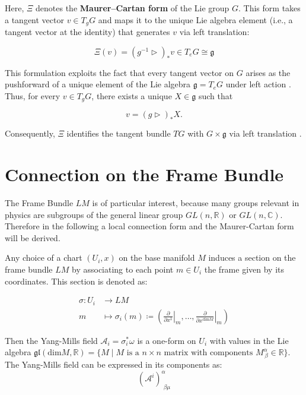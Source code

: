 Here, \( \Xi \) denotes the \textbf{Maurer–Cartan form} of the Lie group \( G \). This form takes a tangent vector \( v \in T_gG \) and maps it to the unique Lie algebra element (i.e., a tangent vector at the identity) that generates \( v \) via left translation:

\[
\Xi(v) = (g^{-1} \triangleright)_* v \in T_eG \cong \mathfrak{g}
\]

This formulation exploits the fact that every tangent vector on \( G \) arises as the pushforward of a unique element of the Lie algebra \( \mathfrak{g} = T_eG \) under left action \cite{RaghunathanLieGroupsLieAlgebras2025}. Thus, for every \( v \in T_gG \), there exists a unique \( X \in \mathfrak{g} \) such that

\[
v = (g \triangleright)_* X.
\]

Consequently, \( \Xi \) identifies the tangent bundle \( TG \) with \( G \times \mathfrak{g} \) via left translation \cite{MaurerCartanform2025}.

\section{Connection on the Frame Bundle}

The Frame Bundle $LM$ is of particular interest, because many groups relevant in physics are subgroups of the general linear group \( GL(n, \mathbb{R}) \) or \( GL(n, \mathbb{C}) \). Therefore in the following a local connection form and the Maurer-Cartan form will be derived.

Any choice of a chart \( (U_i, x) \) on the base manifold \( M \) induces a section on the frame bundle \( LM \) by associating to each point \( m \in U_i \) the frame given by its coordinates. This section is denoted as:

\begin{align*}
  \sigma : U_i &\longrightarrow LM \\
  m &\mapsto \sigma_i(m) \coloneq \left( \left. \frac{\partial}{\partial x^1} \right|_m, \dots , \left. \frac{\partial}{\partial x^{\text{dim}M}} \right|_m  \right)
\end{align*}



Then the Yang-Mills field \( \mathcal{A}_i = \sigma_i^* \omega \) is a one-form on \( U_i \) with values in the Lie algebra $\mathfrak{gl}(\text{dim}M,\mathbb{R}) = \{ M \mid M \text{ is a } n\times n \text{ matrix with components } M^\alpha_{\,\beta}\in \mathbb{R} \}$. The Yang-Mills field can be expressed in its components as:
\[ (\mathcal{A}^i)^\alpha_{\,\,\beta\mu} \]

